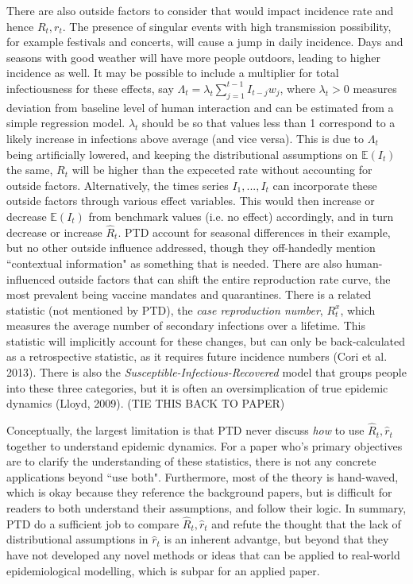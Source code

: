 \documentclass[12pt]{article}
\begin{document}
      There are also outside factors to consider that would impact incidence rate and hence $R_t, r_t$. 
      The presence of singular events with high transmission possibility, for example festivals and concerts, 
      will cause a jump in daily incidence. Days and seasons with good weather will have more people outdoors, leading to higher
      incidence as well. It may be possible to include a multiplier for total infectiousness for these effects, say 
      $\Lambda_t = \lambda_t \sum_{j=1}^{t-1}I_{t - j}w_j$, where $\lambda_t > 0$ measures deviation from baseline level of human interaction 
      and can be estimated from a simple regression model. $\lambda_t$ should be so that values less than 1 correspond to a likely
      increase in infections above average (and vice versa). This is due to $\Lambda_t$ being artificially lowered, 
      and keeping the distributional assumptions on $\mathbb{E}(I_t)$ the same, 
      $R_t$ will be higher than the expeceted rate without accounting for outside factors. Alternatively, the times series
      $I_1,...,I_t$ can incorporate these outside factors through various effect variables. This would then increase or decrease
      $\mathbb{E}(I_t)$ from benchmark values (i.e. no effect) accordingly, and in turn decrease or increase $\hat{R}_t$.
      PTD account for seasonal differences in their example, but no other outside influence addressed, though 
      they off-handedly mention ``contextual information" as something that is needed. There are also human-influenced outside
      factors that can shift the entire reproduction rate curve, the most prevalent being vaccine mandates and quarantines. 
      There is a related statistic (not mentioned by PTD), 
      the \textit{case reproduction number}, $R^x_t$, which measures the average number of secondary infections over a lifetime.
      This statistic will implicitly account for these changes, but can only be back-calculated as a
      retrospective statistic, as it requires future incidence numbers (Cori et al. 2013). There is also the 
      \textit{Susceptible-Infectious-Recovered} model that groups people into these three categories, but it is often an
      oversimplication of true epidemic dynamics (Lloyd, 2009).  (TIE THIS BACK TO PAPER)

      
      Conceptually, the largest limitation is that PTD never discuss \textit{how} to use $\hat{R}_t, \hat{r}_t$ together to
      understand epidemic dynamics. For a paper who's primary objectives are to clarify the understanding of these statistics, 
      there is not any concrete applications beyond ``use both". Furthermore, most of the theory is hand-waved, which is okay
      because they reference the background papers, but is difficult for readers to both understand their assumptions, and follow
      their logic. In summary, PTD do a sufficient job to compare $\hat{R}_t, \hat{r}_t$ and refute the thought that the lack
      of distributional assumptions in $\hat{r}_t$ is an inherent advantge, but beyond that they have not developed any novel 
      methods or ideas that can be applied to real-world epidemiological modelling, which is subpar for an applied paper. 
\end{document}
